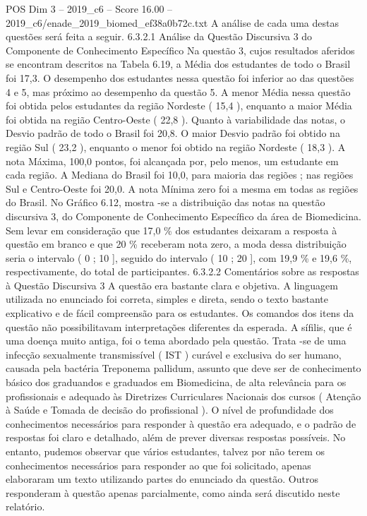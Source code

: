 \begin{textsample}{POS Dim 3 – 2019\_c6 – Score 16.00 – 2019\_c6/enade\_2019\_biomed\_ef38a0b72c.txt}
A análise de cada uma destas questões será feita a seguir. 6.3.2.1 Análise da Questão Discursiva 3 do Componente de Conhecimento Específico Na questão 3, cujos resultados aferidos se encontram descritos na Tabela 6.19, a Média dos estudantes de todo o Brasil foi 17,3.
O desempenho dos estudantes nessa questão foi inferior ao das questões 4 e 5, mas próximo ao desempenho da questão 5.
A menor Média nessa questão foi obtida pelos estudantes da região Nordeste ( 15,4 ), enquanto a maior Média foi obtida na região Centro-Oeste ( 22,8 ).
Quanto à variabilidade das notas, o Desvio padrão de todo o Brasil foi 20,8.
O maior Desvio padrão foi obtido na região Sul ( 23,2 ), enquanto o menor foi obtido na região Nordeste ( 18,3 ).
A nota Máxima, 100,0 pontos, foi alcançada por, pelo menos, um estudante em cada região.
A Mediana do Brasil foi 10,0, para maioria das regiões ; nas regiões Sul e Centro-Oeste foi 20,0.
A nota Mínima zero foi a mesma em todas as regiões do Brasil.
No Gráfico 6.12, mostra -se a distribuição das notas na questão discursiva 3, do Componente de Conhecimento Específico da área de Biomedicina.
Sem levar em consideração que 17,0 \% dos estudantes deixaram a resposta à questão em branco e que 20 \% receberam nota zero, a moda dessa distribuição seria o intervalo ( 0 ; 10 ], seguido do intervalo ( 10 ; 20 ], com 19,9 \% e 19,6 \%, respectivamente, do total de participantes. 6.3.2.2 Comentários sobre as respostas à Questão Discursiva 3 A questão era bastante clara e objetiva.
A linguagem utilizada no enunciado foi correta, simples e direta, sendo o texto bastante explicativo e de fácil compreensão para os estudantes.
Os comandos dos itens da questão não possibilitavam interpretações diferentes da esperada.
A sífilis, que é uma doença muito antiga, foi o tema abordado pela questão.
Trata -se de uma infecção sexualmente transmissível ( IST ) curável e exclusiva do ser humano, causada pela bactéria Treponema pallidum, assunto que deve ser de conhecimento básico dos graduandos e graduados em Biomedicina, de alta relevância para os profissionais e adequado às Diretrizes Curriculares Nacionais dos cursos ( Atenção à Saúde e Tomada de decisão do profissional ).
O nível de profundidade dos conhecimentos necessários para responder à questão era adequado, e o padrão de respostas foi claro e detalhado, além de prever diversas respostas possíveis.
No entanto, pudemos observar que vários estudantes, talvez por não terem os conhecimentos necessários para responder ao que foi solicitado, apenas elaboraram um texto utilizando partes do enunciado da questão.
Outros responderam à questão apenas parcialmente, como ainda será discutido neste relatório.

\end{textsample}
